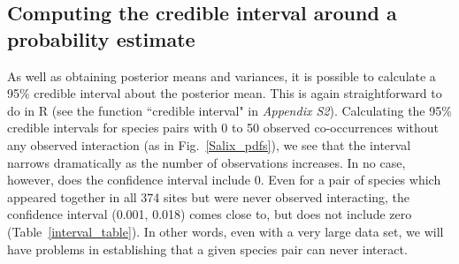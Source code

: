\documentclass[12pt]{article}
\begin{document}

  \subsection*{Computing the credible interval around a probability estimate}

      As well as obtaining posterior means and variances, it is possible to calculate a 95\% credible interval about the posterior mean. This is again straightforward to do in R (see the function ``credible interval" in \emph{Appendix S2}). Calculating the 95\% credible intervals for species pairs with 0 to 50 observed co-occurrences without any observed interaction (as in Fig.~\ref{Salix_pdfs}), we see that the interval narrows dramatically as the number of observations increases. In no case, however, does the confidence interval include 0. Even for a pair of species which appeared together in all 374 sites but were never observed interacting, the confidence interval (0.001, 0.018) comes close to, but does not include zero (Table~\ref{interval_table}). In other words, even with a very large data set, we will have problems in establishing that a given species pair can never interact.

\end{document}
